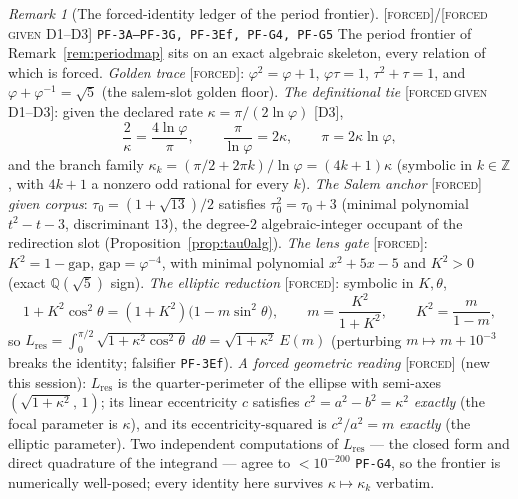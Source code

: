 \documentclass[11pt]{article}
\newcommand{\tagF}{\textcolor{cF}{\textsc{[forced]}}}
\newcommand{\tagFD}{\textcolor{cF}{\textsc{[forced}}\,\textcolor{cD}{\textsc{given D1--D3]}}}
\newcommand{\hx}[1]{\textcolor{cC}{\footnotesize\texttt{#1}}}
\newcommand{\Q}{\mathbb{Q}}
\newcommand{\Z}{\mathbb{Z}}
\newcommand{\gp}{\varphi}
\newcommand{\gapc}{\mathrm{gap}}
\theoremstyle{plain}
\theoremstyle{definition}
\theoremstyle{remark}
\newtheorem{remark}[theorem]{Remark}
\begin{document}
\begin{remark}[The forced-identity ledger of the period frontier]\label{rem:pfledger}\tagF{}/\tagFD{} \hx{PF-3A--PF-3G, PF-3Ef, PF-G4, PF-G5}
The period frontier of Remark~\ref{rem:periodmap} sits on an exact algebraic
skeleton, every relation of which is forced. \emph{Golden trace} \tagF{}:
$\gp^2=\gp+1$, $\gp\tau=1$, $\tau^2+\tau=1$, and $\gp+\gp^{-1}=\sqrt5$ (the
salem-slot golden floor). \emph{The definitional tie} \tagFD{}: given the
declared rate $\kappa=\pi/(2\ln\gp)$ [D3],
\[
\frac2\kappa=\frac{4\ln\gp}{\pi},\qquad \frac{\pi}{\ln\gp}=2\kappa,\qquad
\pi=2\kappa\ln\gp,
\]
and the branch family $\kappa_k=(\pi/2+2\pi k)/\ln\gp=(4k+1)\kappa$ (symbolic in
$k\in\Z$, with $4k+1$ a nonzero odd rational for every $k$). \emph{The Salem
anchor} \tagF{}\emph{ given corpus}: $\tau_0=(1+\sqrt{13})/2$ satisfies
$\tau_0^2=\tau_0+3$ (minimal polynomial $t^2-t-3$, discriminant $13$), the
degree-$2$ algebraic-integer occupant of the redirection slot
(Proposition~\ref{prop:tau0alg}). \emph{The lens gate} \tagF{}: $K^2=1-\gapc$,
$\gapc=\gp^{-4}$, with minimal polynomial $x^2+5x-5$ and $K^2>0$ (exact
$\Q(\sqrt5)$ sign). \emph{The elliptic reduction} \tagF{}: symbolic in
$K,\theta$,
\[
1+K^2\cos^2\theta=(1+K^2)\bigl(1-m\sin^2\theta\bigr),\qquad
m=\frac{K^2}{1+K^2},\qquad K^2=\frac{m}{1-m},
\]
so $L_{\mathrm{res}}=\int_0^{\pi/2}\sqrt{1+\kappa^2\cos^2\theta}\;d\theta
=\sqrt{1+\kappa^2}\,E(m)$ (perturbing $m\mapsto m+10^{-3}$ breaks the identity;
falsifier \hx{PF-3Ef}). \emph{A forced geometric reading} \tagF{} (new this
session): $L_{\mathrm{res}}$ is the quarter-perimeter of the ellipse with
semi-axes $(\sqrt{1+\kappa^2},\,1)$; its linear eccentricity $c$ satisfies
$c^2=a^2-b^2=\kappa^2$ \emph{exactly} (the focal parameter is $\kappa$), and its
eccentricity-squared is $c^2/a^2=m$ \emph{exactly} (the elliptic parameter). Two
independent computations of $L_{\mathrm{res}}$ --- the closed form and direct
quadrature of the integrand --- agree to $<10^{-200}$ \hx{PF-G4}, so the frontier
is numerically well-posed; every identity here survives $\kappa\mapsto\kappa_k$
verbatim.
\end{remark}
\end{document}
